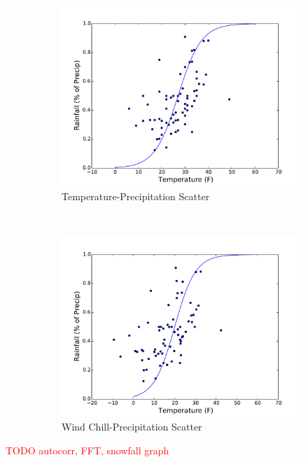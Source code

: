 \documentclass[11pt, letterpaper]{article}
\begin{document}
\begin{figure}[H]
  \centering
  \begin{subfigure}[b]{0.45\textwidth}
    \includegraphics[width=\textwidth]{figures/daily_temp_precip_scatter.pdf}
    \caption{Temperature-Precipitation Scatter}
  \end{subfigure}
  ~
  \begin{subfigure}[b]{0.45\textwidth}
    \includegraphics[width=\textwidth]{figures/daily_wind_chill_precip_scatter.pdf}
    \caption{Wind Chill-Precipitation Scatter}
  \end{subfigure}
  \caption{}
\end{figure}

\textcolor{red}{TODO autocorr, FFT, snowfall graph}
\end{document}
